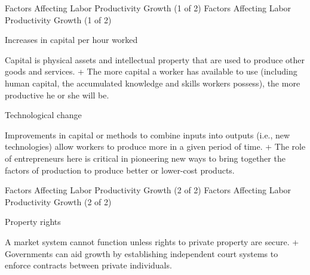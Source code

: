 \documentclass[
  12pt,
  ignorenonframetext,
]{beamer}
\begin{document}
\begin{frame}{Factors Affecting Labor Productivity Growth (1 of 2)}
\label{factors-affecting-labor-productivity-growth-1-of-2}
Factors Affecting Labor Productivity Growth (1 of 2)

Increases in capital per hour worked

Capital is physical assets and intellectual property that are used to
produce other goods and services. + The more capital a worker has
available to use (including human capital, the accumulated knowledge and
skills workers possess), the more productive he or she will be.

Technological change

Improvements in capital or methods to combine inputs into outputs (i.e.,
new technologies) allow workers to produce more in a given period of
time. + The role of entrepreneurs here is critical in pioneering new
ways to bring together the factors of production to produce better or
lower-cost products.
\end{frame}

\begin{frame}{Factors Affecting Labor Productivity Growth (2 of 2)}
\label{factors-affecting-labor-productivity-growth-2-of-2}
Factors Affecting Labor Productivity Growth (2 of 2)

Property rights

A market system cannot function unless rights to private property are
secure. + Governments can aid growth by establishing independent court
systems to enforce contracts between private individuals.
\end{frame}
\end{document}
